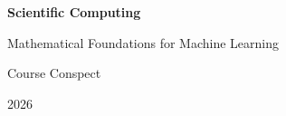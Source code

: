 \documentclass[11pt,oneside,openany]{book}
\begin{document}
\hypersetup{pageanchor=false}
\begin{titlepage}
  \centering
  \vspace*{0.16\textheight}
  {\color{CourseBlue}\sffamily\bfseries\Huge Scientific Computing\par}
  \vspace{0.8em}
  {\sffamily\Large Mathematical Foundations for Machine Learning\par}
  \vspace{2.5em}
  {\large Course Conspect\par}
  \vfill
  {\large 2026\par}
\end{titlepage}
\frontmatter
\hypersetup{pageanchor=true}



\tableofcontents

\mainmatter









\end{document}
